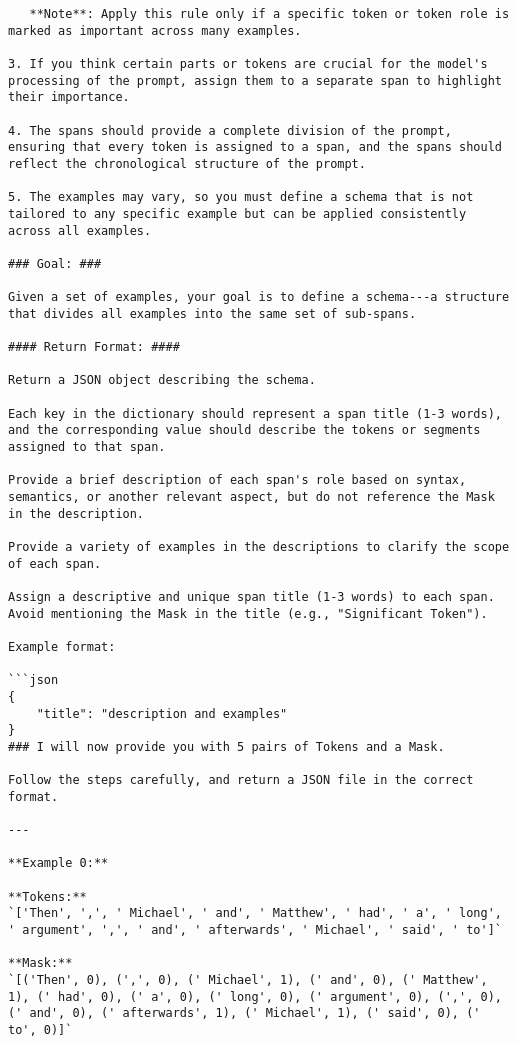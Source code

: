 \begin{lstlisting}
   **Note**: Apply this rule only if a specific token or token role is marked as important across many examples.  

3. If you think certain parts or tokens are crucial for the model's processing of the prompt, assign them to a separate span to highlight their importance.  

4. The spans should provide a complete division of the prompt, ensuring that every token is assigned to a span, and the spans should reflect the chronological structure of the prompt.  

5. The examples may vary, so you must define a schema that is not tailored to any specific example but can be applied consistently across all examples.  

### Goal: ###  

Given a set of examples, your goal is to define a schema---a structure that divides all examples into the same set of sub-spans.  

#### Return Format: ####  

Return a JSON object describing the schema.  

Each key in the dictionary should represent a span title (1-3 words), and the corresponding value should describe the tokens or segments assigned to that span.  

Provide a brief description of each span's role based on syntax, semantics, or another relevant aspect, but do not reference the Mask in the description.  

Provide a variety of examples in the descriptions to clarify the scope of each span.  

Assign a descriptive and unique span title (1-3 words) to each span. Avoid mentioning the Mask in the title (e.g., "Significant Token").  

Example format:  

```json
{
    "title": "description and examples"
}
### I will now provide you with 5 pairs of Tokens and a Mask.  

Follow the steps carefully, and return a JSON file in the correct format.  

---

**Example 0:**  

**Tokens:**  
`['Then', ',', ' Michael', ' and', ' Matthew', ' had', ' a', ' long', ' argument', ',', ' and', ' afterwards', ' Michael', ' said', ' to']`  

**Mask:**  
`[('Then', 0), (',', 0), (' Michael', 1), (' and', 0), (' Matthew', 1), (' had', 0), (' a', 0), (' long', 0), (' argument', 0), (',', 0), (' and', 0), (' afterwards', 1), (' Michael', 1), (' said', 0), (' to', 0)]`  


\end{lstlisting}
